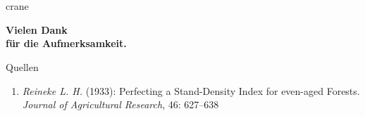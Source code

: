 \section*{}

\begin{frame}[plain]
  \begin{center}

    \begin{minipage}{0.75\textwidth}
      \begin{beamercolorbox}{crane}
        \begin{center}
          \vspace{1em}
          \textbf{\huge Vielen Dank}
          \\
          \textbf{\small für die Aufmerksamkeit.}
          \\
        \end{center}
      \end{beamercolorbox}
    \end{minipage}

    \hspace{0.017\textwidth}  %
    \begin{minipage}{0.725\textwidth}
      \begin{block}{Quellen}
        \begin{tiny}
          \begin{enumerate}
          \item \emph{Reineke L. H.} (1933): Perfecting a Stand-Density Index for even-aged Forests. \emph{Journal of Agricultural Research}, 46: 627--638
          \end{enumerate}
        \end{tiny}
      \end{block}
    \end{minipage}
  \end{center}
  
\end{frame}

